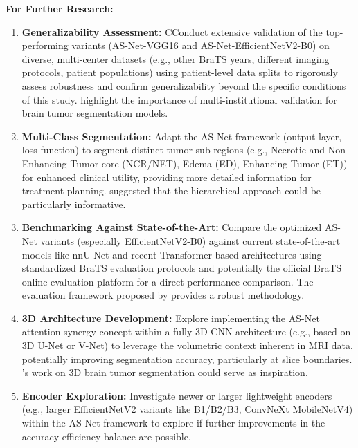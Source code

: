\textbf{For Further Research:}
\begin{enumerate}
  \item \textbf{Generalizability Assessment:} CConduct extensive validation of the top-performing variants (AS-Net-VGG16 and AS-Net-EfficientNetV2-B0) on diverse, multi-center datasets (e.g., other BraTS years, different imaging protocols, patient populations) using patient-level data splits to rigorously assess robustness and confirm generalizability beyond the specific conditions of this study. \textcite{bakas2018identifying} highlight the importance of multi-institutional validation for brain tumor segmentation models.

  \item \textbf{Multi-Class Segmentation:} Adapt the AS-Net framework (output layer, loss function) to segment distinct tumor sub-regions (e.g., Necrotic and Non-Enhancing Tumor core (NCR/NET), Edema (ED), Enhancing Tumor (ET)) for enhanced clinical utility, providing more detailed information for treatment planning. \textcite{isensee2018brain} suggested that the hierarchical approach could be particularly informative.

  \item \textbf{Benchmarking Against State-of-the-Art:} Compare the optimized AS-Net variants (especially EfficientNetV2-B0) against current state-of-the-art models like nnU-Net  \parencite{isensee2021nnu} and recent Transformer-based architectures using standardized BraTS evaluation protocols and potentially the official BraTS online evaluation platform for a direct performance comparison. The evaluation framework proposed by \textcite{menze2015multimodal} provides a robust methodology.

  \item \textbf{3D Architecture Development:} Explore implementing the AS-Net attention synergy concept within a fully 3D CNN architecture (e.g., based on 3D U-Net or V-Net) to leverage the volumetric context inherent in MRI data, potentially improving segmentation accuracy, particularly at slice boundaries. \textcite{myronenko20183d}'s work on 3D brain tumor segmentation could serve as inspiration.

  \item \textbf{Encoder Exploration:} Investigate newer or larger lightweight encoders (e.g., larger EfficientNetV2 variants like B1/B2/B3, ConvNeXt \parencite{liu2022convnet} MobileNetV4) within the AS-Net framework to explore if further improvements in the accuracy-efficiency balance are possible.


\end{enumerate}
